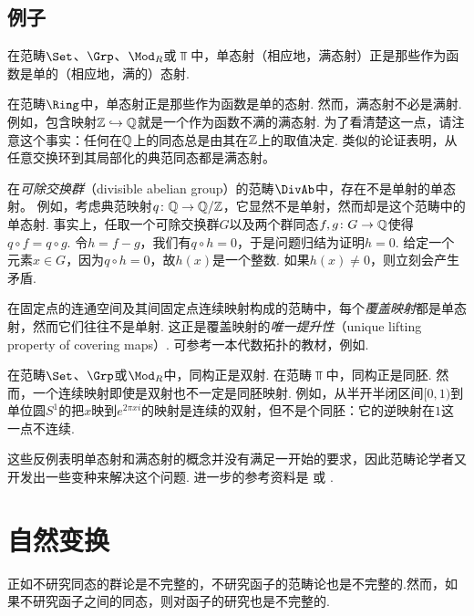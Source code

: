 \subsection{例子}
  \begin{exam}
    在范畴$\Set$、$\Grp$、$\Mod_R$或$\Top$中，单态射（相应地，满态射）正是那些作为函数是单的（相应地，满的）态射.
  \end{exam}
  \begin{exam}
    在范畴$\Ring$中，单态射正是那些作为函数是单的态射. 然而，满态射不必是满射. 例如，包含映射${\mathbb Z}\hookrightarrow{\mathbb Q}$就是一个作为函数不满的满态射.
    为了看清楚这一点，请注意这个事实：任何在${\mathbb Q}$上的同态总是由其在${\mathbb Z}$上的取值决定.
    类似的论证表明，从任意交换环到其局部化的典范同态都是满态射。
  \end{exam}
  \begin{exam}
    在\emph{可除交换群}（divisible abelian group）的范畴$\DivAb$中，存在不是单射的单态射。
    例如，考虑典范映射$q\colon{\mathbb Q}\to{\mathbb Q}/{\mathbb Z}$，它显然不是单射，然而却是这个范畴中的单态射.
    事实上，任取一个可除交换群$G$以及两个群同态$f,g\colon G \to{\mathbb Q}$使得$q\circ f = q\circ g$. 令$h = f - g$，我们有$q\circ h = 0$，于是问题归结为证明$h=0$. 给定一个元素$x\in G$，因为$q \circ h = 0$，故$h(x)$是一个整数. 如果$h(x)\neq0$，则立刻会产生矛盾.
  \end{exam}
  \begin{exam}
    在固定点的连通空间及其间固定点连续映射构成的范畴中，每个\emph{覆盖映射}都是单态射，然而它们往往不是单射.
    这正是覆盖映射的\emph{唯一提升性}（unique lifting property of covering maps）.
    可参考一本代数拓扑的教材，例如\cite{AllenHatcher}.
  \end{exam}
  \begin{exam}
    在范畴$\Set$、$\Grp$或$\Mod_R$中，同构正是双射.
    在范畴$\Top$中，同构正是同胚.
    然而，一个连续映射即使是双射也不一定是同胚映射.
    例如，从半开半闭区间$[0,1)$到单位圆$S^1$的把$x$映到$e^{2\pi x i}$的映射是连续的双射，但不是个同胚：它的逆映射在$1$这一点不连续.
  \end{exam}

  这些反例表明单态射和满态射的概念并没有满足一开始的要求，因此范畴论学者又开发出一些变种来解决这个问题.
  进一步的参考资料是 \nlab 或 \hrefacc.

\section{自然变换}
  正如不研究同态的群论是不完整的，不研究函子的范畴论也是不完整的.然而，如果不研究函子之间的同态，则对函子的研究也是不完整的.

